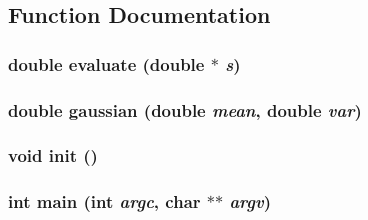 \subsection{Function Documentation}
\hypertarget{aco-r_8cpp_c5992296530c3f2c91fb35345606b029}{
\subsubsection{\setlength{\rightskip}{0pt plus 5cm}double evaluate (double $\ast$ {\em s})}}
\label{aco-r_8cpp_c5992296530c3f2c91fb35345606b029}


\hypertarget{aco-r_8cpp_c49c8f28940eb73a2d3c5d4f54a77acb}{
\subsubsection{\setlength{\rightskip}{0pt plus 5cm}double gaussian (double {\em mean}, \/  double {\em var})}}
\label{aco-r_8cpp_c49c8f28940eb73a2d3c5d4f54a77acb}


\hypertarget{aco-r_8cpp_02fd73d861ef2e4aabb38c0c9ff82947}{
\subsubsection{\setlength{\rightskip}{0pt plus 5cm}void init ()}}
\label{aco-r_8cpp_02fd73d861ef2e4aabb38c0c9ff82947}


\hypertarget{aco-r_8cpp_3c04138a5bfe5d72780bb7e82a18e627}{
\subsubsection{\setlength{\rightskip}{0pt plus 5cm}int main (int {\em argc}, \/  char $\ast$$\ast$ {\em argv})}}
\label{aco-r_8cpp_3c04138a5bfe5d72780bb7e82a18e627}




